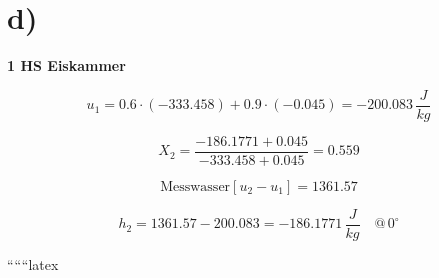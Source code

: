 

\section*{d)}

\textbf{1 HS Eiskammer}

\[
u_1 = 0.6 \cdot (-333.458) + 0.9 \cdot (-0.045) = -200.083 \, \frac{J}{kg}
\]

\[
X_2 = \frac{-186.1771 + 0.045}{-333.458 + 0.045} = 0.559
\]

\[
\text{Messwasser} \left[ u_2 - u_1 \right] = 1361.57
\]

\[
h_2 = 1361.57 - 200.083 = -186.1771 \, \frac{J}{kg} \quad @ \, 0^\circ
\]

``````latex